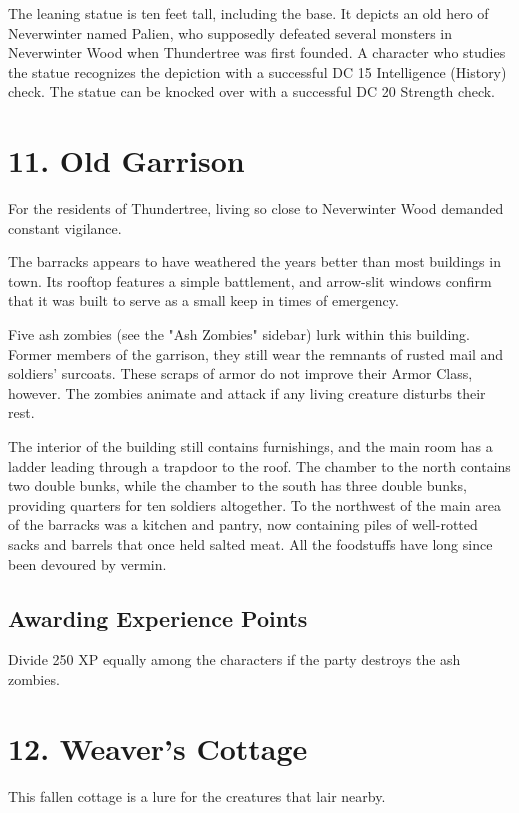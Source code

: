 \documentclass[10pt,a4paper,twoside,bg=print,twocolumn,openany,nodeprecatedcode]{dndbook}
\begin{document}
The leaning statue is ten feet tall, including the base. It depicts an old hero of Neverwinter named Palien, who supposedly defeated several monsters in Neverwinter Wood when Thundertree was first founded. A character who studies the statue recognizes the depiction with a successful DC 15 Intelligence (History) check. The statue can be knocked over with a successful DC 20 Strength check.

\section{11. Old Garrison}
For the residents of Thundertree, living so close to Neverwinter Wood demanded constant vigilance.

\begin{DndReadAloud}{}
The barracks appears to have weathered the years better than most buildings in town. Its rooftop features a simple battlement, and arrow-slit windows confirm that it was built to serve as a small keep in times of emergency.

\end{DndReadAloud}

Five ash zombies (see the "Ash Zombies" sidebar) lurk within this building. Former members of the garrison, they still wear the remnants of rusted mail and soldiers' surcoats. These scraps of armor do not improve their Armor Class, however. The zombies animate and attack if any living creature disturbs their rest.

The interior of the building still contains furnishings, and the main room has a ladder leading through a trapdoor to the roof. The chamber to the north contains two double bunks, while the chamber to the south has three double bunks, providing quarters for ten soldiers altogether. To the northwest of the main area of the barracks was a kitchen and pantry, now containing piles of well-rotted sacks and barrels that once held salted meat. All the foodstuffs have long since been devoured by vermin.

\subsection{Awarding Experience Points}
Divide 250 XP equally among the characters if the party destroys the ash zombies.

\section{12. Weaver's Cottage}
This fallen cottage is a lure for the creatures that lair nearby.
\end{document}
